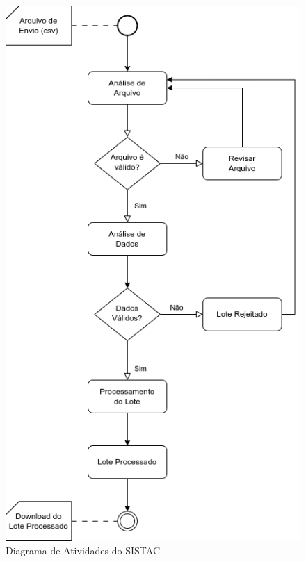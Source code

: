 \documentclass[
	12pt,			%
	openright,		%
	oneside,	
	a4paper,		%
	english,		%
	brazil			%
]{abntex2/abntex2}  %
\begin{document}
		\clearpage
		\begin{figure}[!ht]
			\begin{center}
				
				\caption{Diagrama de Atividades do SISTAC}
				\includegraphics[scale=0.75]{img/diagrama-ativs-sistac}
				
			\end{center}
		\end{figure}
		
\end{document}
